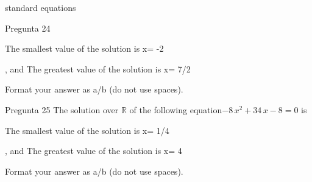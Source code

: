 \begin{quiz}{standard equations }
\begin{cloze}{Pregunta 24 }
\begin{shortanswer}The smallest value of the solution is x=  -2 \end{shortanswer}
\begin{shortanswer}, and  The greatest value of the solution is x=  7/2 \end{shortanswer}
Format your answer as a/b (do not use spaces).\end{cloze}\begin{cloze}{Pregunta 25 } The solution over $\mathbb{R}$ of the following equation$ -8\,x^2+34\,x-8=0  $ is 
\begin{shortanswer}The smallest value of the solution is x=  1/4 \end{shortanswer}
\begin{shortanswer}, and  The greatest value of the solution is x=  4 \end{shortanswer}
Format your answer as a/b (do not use spaces).\end{cloze}\end{quiz}
